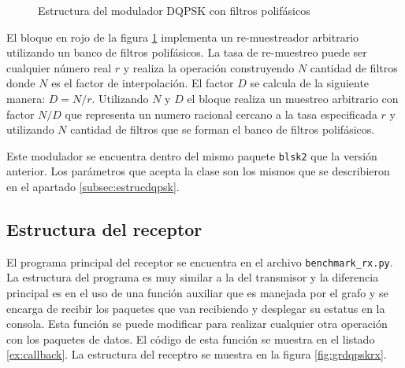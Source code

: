 \begin{figure}[htp]
  \centering
  \vspace{0.5in}
  \vspace{0.3in}
  \caption{Estructura del modulador DQPSK con filtros polif\'asicos}
  \label{fig:dqpsk2}
\end{figure}

El bloque en rojo de la figura \ref{fig:dqpsk2} implementa un re-muestreador arbitrario utilizando un banco de filtros
polif\'asicos. La tasa de re-muestreo puede ser cualquier n\'umero real $r$ y realiza la operaci\'on construyendo $N$
cantidad de filtros donde $N$ es el factor de interpolaci\'on. El factor $D$ se calcula de la siguiente manera: $D=N/r$.
Utilizando $N$ y $D$ el bloque realiza un muestreo arbitrario con factor $N/D$ que representa un numero racional cercano a
la tasa especificada $r$ y utilizando $N$ cantidad de filtros que se forman el banco de filtros polif\'asicos.

Este modulador se encuentra dentro del mismo paquete \verb|blsk2| que la versi\'on anterior. Los par\'ametros que acepta la
clase son los mismos que se describieron en el apartado \ref{subsec:estrucdqpsk}.

\subsection{Estructura del receptor}
El programa principal del receptor se encuentra en el archivo \verb|benchmark_rx.py|. La estructura del programa es muy
similar a la del transmisor y la diferencia principal es en el uso de una funci\'on auxiliar que es manejada por el grafo y
se encarga de recibir los paquetes que van recibiendo y desplegar su estatus en la consola. Esta funci\'on se puede
modificar para realizar cualquier otra operaci\'on con los paquetes de datos. El c\'odigo de esta funci\'on se muestra
en el listado \ref{ex:callback}. La estructura del receptro se muestra en la figura \ref{fig:grdqpskrx}.

